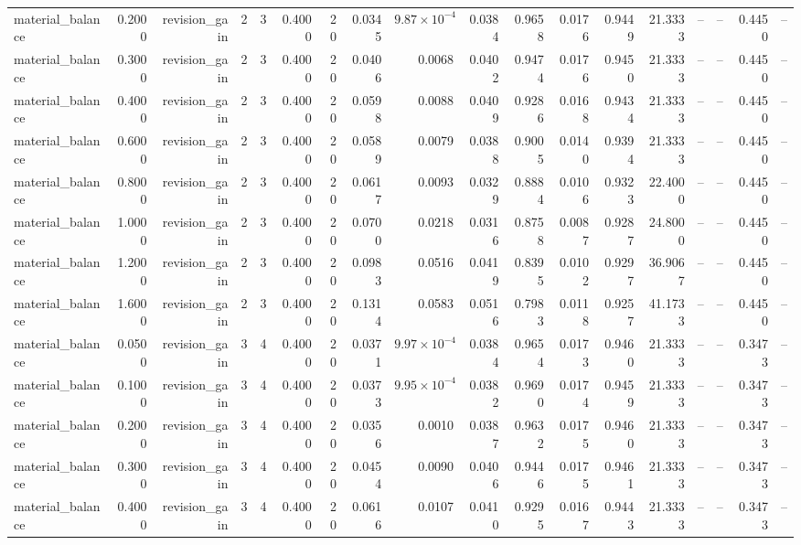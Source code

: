 \begin{table}[htbp]
\begin{tabular}{lrrrrrrrrrrrrrrrrr}
material\_balance & 0.2000 & revision\_gain & 2 & 3 & 0.4000 & 20 & 0.0345 & $9.87\times10^{-4}$ & 0.0384 & 0.9658 & 0.0176 & 0.9449 & 21.3333 & -- & -- & 0.4450 & -- \\
material\_balance & 0.3000 & revision\_gain & 2 & 3 & 0.4000 & 20 & 0.0406 & 0.0068 & 0.0402 & 0.9474 & 0.0176 & 0.9450 & 21.3333 & -- & -- & 0.4450 & -- \\
material\_balance & 0.4000 & revision\_gain & 2 & 3 & 0.4000 & 20 & 0.0598 & 0.0088 & 0.0409 & 0.9286 & 0.0168 & 0.9434 & 21.3333 & -- & -- & 0.4450 & -- \\
material\_balance & 0.6000 & revision\_gain & 2 & 3 & 0.4000 & 20 & 0.0589 & 0.0079 & 0.0388 & 0.9005 & 0.0140 & 0.9394 & 21.3333 & -- & -- & 0.4450 & -- \\
material\_balance & 0.8000 & revision\_gain & 2 & 3 & 0.4000 & 20 & 0.0617 & 0.0093 & 0.0329 & 0.8884 & 0.0106 & 0.9323 & 22.4000 & -- & -- & 0.4450 & -- \\
material\_balance & 1.0000 & revision\_gain & 2 & 3 & 0.4000 & 20 & 0.0700 & 0.0218 & 0.0316 & 0.8758 & 0.0087 & 0.9287 & 24.8000 & -- & -- & 0.4450 & -- \\
material\_balance & 1.2000 & revision\_gain & 2 & 3 & 0.4000 & 20 & 0.0983 & 0.0516 & 0.0419 & 0.8395 & 0.0102 & 0.9297 & 36.9067 & -- & -- & 0.4450 & -- \\
material\_balance & 1.6000 & revision\_gain & 2 & 3 & 0.4000 & 20 & 0.1314 & 0.0583 & 0.0516 & 0.7983 & 0.0118 & 0.9257 & 41.1733 & -- & -- & 0.4450 & -- \\
material\_balance & 0.0500 & revision\_gain & 3 & 4 & 0.4000 & 20 & 0.0371 & $9.97\times10^{-4}$ & 0.0384 & 0.9654 & 0.0173 & 0.9460 & 21.3333 & -- & -- & 0.3473 & -- \\
material\_balance & 0.1000 & revision\_gain & 3 & 4 & 0.4000 & 20 & 0.0373 & $9.95\times10^{-4}$ & 0.0382 & 0.9690 & 0.0174 & 0.9459 & 21.3333 & -- & -- & 0.3473 & -- \\
material\_balance & 0.2000 & revision\_gain & 3 & 4 & 0.4000 & 20 & 0.0356 & 0.0010 & 0.0387 & 0.9632 & 0.0175 & 0.9460 & 21.3333 & -- & -- & 0.3473 & -- \\
material\_balance & 0.3000 & revision\_gain & 3 & 4 & 0.4000 & 20 & 0.0454 & 0.0090 & 0.0406 & 0.9446 & 0.0175 & 0.9461 & 21.3333 & -- & -- & 0.3473 & -- \\
material\_balance & 0.4000 & revision\_gain & 3 & 4 & 0.4000 & 20 & 0.0616 & 0.0107 & 0.0410 & 0.9295 & 0.0167 & 0.9443 & 21.3333 & -- & -- & 0.3473 & -- \\

\end{tabular}
\end{table}
